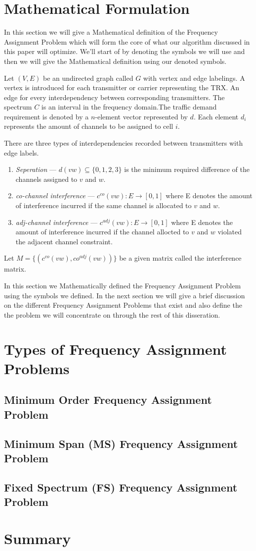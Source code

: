 \section{Mathematical Formulation}
In this section we will give a Mathematical definition of the Frequency Assignment Problem which will form the core of what our algorithm discussed in this paper will optimize. We'll start of by denoting the symbols we will use and then we will give the Mathematical definition using our denoted symbols.

Let \((V,E)\) be an undirected graph called \(G\) with vertex and edge labelings. A vertex is introduced for each transmitter or carrier representing the TRX. An edge for every interdependency between corresponding transmitters. The spectrum \(C\) is an interval in the frequency domain.The traffic demand requirement is denoted by a \(n\)-element vector represented by \(d\). Each element \(d_i\) represents the amount of channels to be assigned to cell \(i\).

There are three types of interdependencies recorded between transmitters with edge labels.
\begin{enumerate}
\item \emph{Seperation} --- \(d(vw) \subseteq \{0,1,2,3\}\) is the minimum required difference of the channels assigned to \(v\) and \(w\).
\item \emph{co-channel interference} --- \(c^{co} (vw) : E \rightarrow [0,1]\) where E denotes the amount of interference incurred if the same channel is allocated to \(v\) and \(w\).
\item \emph{adj-channel interference} --- \(c^{adj} (vw) : E \rightarrow [0,1]\) where E denotes the amount of interference incurred if the channel allocted to \(v\) and \(w\) violated the adjacent channel constraint.
\end{enumerate}

Let \(M = \lbrace (c^{co} (vw),co^{adj} (vw))\rbrace\) be a given matrix called the interference matrix.

In this section we Mathematically defined the Frequency Assignment Problem using the symbols we defined. In the next section we will give a brief discussion on the different Frequency Assignment Problems that exist and also define the the problem we will concentrate on through the rest of this disseration.
\section{Types of Frequency Assignment Problems}
\subsection{Minimum Order Frequency Assignment Problem}
\subsection{Minimum Span (MS) Frequency Assignment Problem}
\subsection{Fixed Spectrum (FS) Frequency Assignment Problem}
\section{Summary}
